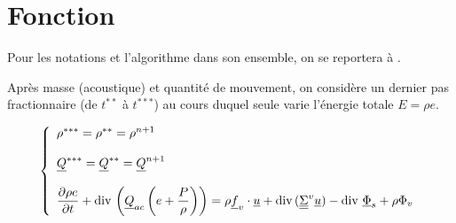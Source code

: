 
%
%
%
%



\hypertarget{cfener}{}

\vspace{1cm}
\section*{Fonction}

Pour les notations et l'algorithme dans son ensemble,
on se reportera \`a .

Apr\`es masse (acoustique) et quantit\'e de mouvement,
on consid\`ere un dernier pas fractionnaire (de $t^{**}$ \`a $t^{***}$)
au cours duquel seule varie l'\'energie totale $E = \rho e$.

\begin{equation}\label{Cfbl_Cfener_eq_energie_cfener}
\left\{\begin{array}{l}
\rho^{***}=\rho^{**}=\rho^{n+1}\\
\\
\underline{Q}^{***}=\underline{Q}^{**}=\underline{Q}^{n+1}\\
\\
\displaystyle\frac{\partial \rho e}{\partial t}
+ \text{div}\,\left( \underline{Q}_{ac} \left(e+\displaystyle\frac{P}{\rho}\right) \right)
= \rho\underline{f}_v\cdot\underline{u}
+ \text{div}\,(\underline{\underline{\Sigma}}^v \underline{u})
- \text{div}\,{\,\underline{\Phi}_s} + \rho\Phi_v
\end{array}\right.
\end{equation}


